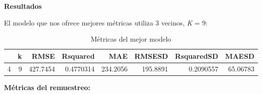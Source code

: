 \documentclass[
]{article}
\begin{document}
\textbf{Resultados}

El modelo que nos ofrece mejores métricas utiliza 3 vecinos, \emph{K} =
9:

\begin{table}[H]

\caption{\label{tab:unnamed-chunk-28}Métricas del mejor modelo}
\centering
\begin{tabular}[t]{lrrrrrrr}
\toprule
  & k & RMSE & Rsquared & MAE & RMSESD & RsquaredSD & MAESD\\
\midrule
4 & 9 & 427.7454 & 0.4770314 & 234.2056 & 195.8891 & 0.2090557 & 65.06783\\
\bottomrule
\end{tabular}
\end{table}

\textbf{Métricas del remuestreo:}
\end{document}
